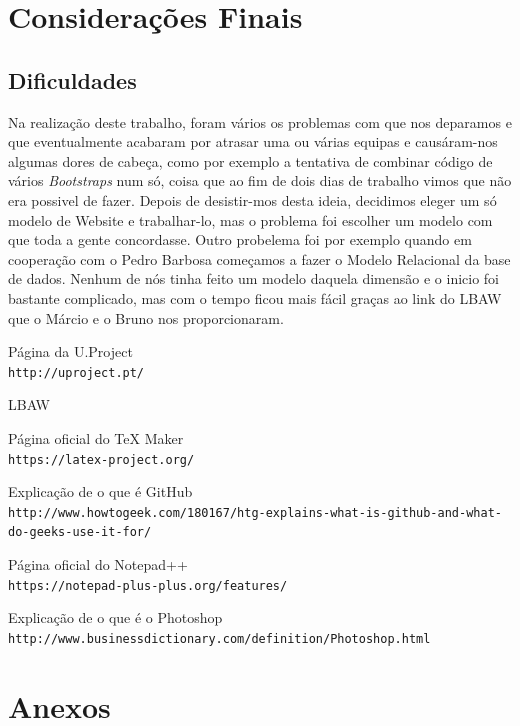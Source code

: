 \documentclass[11pt]{report}
\begin{document}
\chapter{Considerações Finais}

\section{Dificuldades}
Na realização deste trabalho, foram vários os problemas com que nos deparamos e que eventualmente acabaram por atrasar uma ou várias equipas e causáram-nos algumas dores de cabeça, como por exemplo a tentativa de combinar código de vários \textit{Bootstraps} num só, coisa que ao fim de dois dias de trabalho vimos que não era possivel de fazer.
Depois de desistir-mos desta ideia, decidimos eleger um só modelo de Website e trabalhar-lo, mas o problema foi escolher um modelo com que toda a gente concordasse.
Outro probelema foi por exemplo quando em cooperação com o Pedro Barbosa começamos a fazer o Modelo Relacional da base de dados. Nenhum de nós tinha feito um modelo daquela dimensão e o inicio foi bastante complicado, mas com o tempo ficou mais fácil graças ao link do LBAW que o Márcio e o Bruno nos proporcionaram.

\newpage

\begin{thebibliography}{9}
Página da U.Project
\\\texttt{http://uproject.pt/}

LBAW

Página oficial do TeX Maker
\\\texttt{https://latex-project.org/}

Explicação de o que é GitHub
\\\texttt{http://www.howtogeek.com/180167/htg-explains-what-is-github-and-what-do-geeks-use-it-for/}

Página oficial do Notepad++
\\\texttt{https://notepad-plus-plus.org/features/}

Explicação de o que é o Photoshop
\\\texttt{http://www.businessdictionary.com/definition/Photoshop.html}
\end{thebibliography}


\chapter{Anexos}
\end{document}
